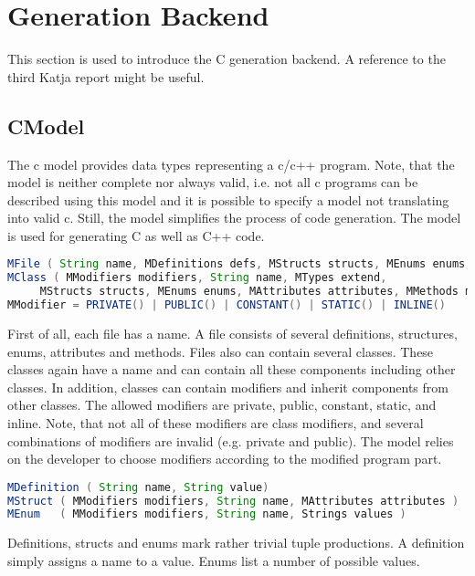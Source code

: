 \documentclass{report}
\begin{document}
\section{Generation Backend}
This section is used to introduce the C generation backend. A reference to the third Katja report might be useful.

\subsection{CModel}
\label{sec:cmodel}
The c model provides data types representing a c/c++ program. Note, that the model is neither complete nor always valid, i.e. not all c programs can be described using this model and it is possible to specify a model not translating into valid c. Still, the model simplifies the process of code generation. The model is used for generating C as well as C++ code.

\begin{lstlisting}[language=java, breaklines=true]
MFile ( String name, MDefinitions defs, MStructs structs, MEnums enums, MAttributes attributes, MMethods methods, MClasses classes )
MClass ( MModifiers modifiers, String name, MTypes extend, 
	 MStructs structs, MEnums enums, MAttributes attributes, MMethods methods, MClasses nested )
MModifier = PRIVATE() | PUBLIC() | CONSTANT() | STATIC() | INLINE()
\end{lstlisting}

First of all, each file has a name. A file consists of several definitions, structures, enums, attributes and methods. Files also can contain several classes. These classes again have a name and can contain all these components including other classes. In addition, classes can contain modifiers and inherit components from other classes.
The allowed modifiers are private, public, constant, static, and inline. Note, that not all of these modifiers are class modifiers, and several combinations of modifiers are invalid (e.g. private and public). The model relies on the developer to choose modifiers according to the modified program part.

\begin{lstlisting}[language=java, breaklines=true]
MDefinition ( String name, String value)
MStruct ( MModifiers modifiers, String name, MAttributes attributes )
MEnum   ( MModifiers modifiers, String name, Strings values )
\end{lstlisting}

Definitions, structs and enums mark rather trivial tuple productions. A definition simply assigns a name to a value. %
Enums list a number of possible values.
\end{document}

